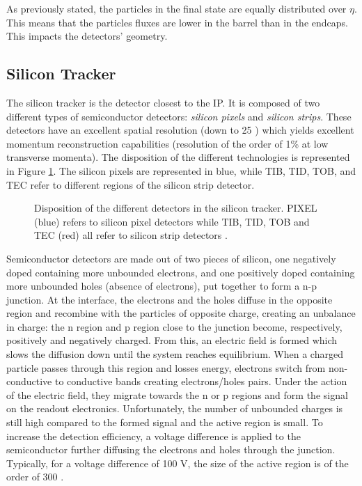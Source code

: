 			As previously stated, the particles in the final state are equally distributed over $ \eta $. This means that the particles fluxes are lower in the barrel than in the endcaps. This impacts the detectors' geometry.

		\subsection{Silicon Tracker}
		\label{sec:lhc_and_cms__tracker}

			The silicon tracker is the detector closest to the IP. It is composed of two different types of semiconductor detectors: \emph{silicon pixels} and \emph{silicon strips}. These detectors have an excellent spatial resolution (down to 25 \um{}) which yields excellent momentum reconstruction capabilities (resolution of the order of 1\% at low transverse momenta). The disposition of the different technologies is represented in Figure \ref{fig:lhc_and_cms__cms_tracker}. The silicon pixels are represented in blue, while TIB, TID, TOB, and TEC refer to different regions of the silicon strip detector. \\

			\begin{figure}[h!]
				\centering
				\caption{Disposition of the different detectors in the silicon tracker. PIXEL (blue) refers to silicon pixel detectors while TIB, TID, TOB and TEC (red) all refer to silicon strip detectors \Cite{CMS_at_LHC}.}
				\label{fig:lhc_and_cms__cms_tracker}
			\end{figure}

			Semiconductor detectors are made out of two pieces of silicon, one negatively doped containing more unbounded electrons, and one positively doped containing more unbounded holes (absence of electrons), put together to form a n-p junction. At the interface, the electrons and the holes diffuse in the opposite region and recombine with the particles of opposite charge, creating an unbalance in charge: the n region and p region close to the junction become, respectively, positively and negatively charged. From this, an electric field is formed which slows the diffusion down until the system reaches equilibrium. When a charged particle passes through this region and losses energy, electrons switch from non-conductive to conductive bands creating electrons/holes pairs. Under the action of the electric field, they migrate towards the n or p regions and form the signal on the readout electronics. Unfortunately, the number of unbounded charges is still high compared to the formed signal and the active region is small. To increase the detection efficiency, a voltage difference is applied to the semiconductor further diffusing the electrons and holes through the junction. Typically, for a voltage difference of 100 V, the size of the active region is of the order of 300 \um{}.

